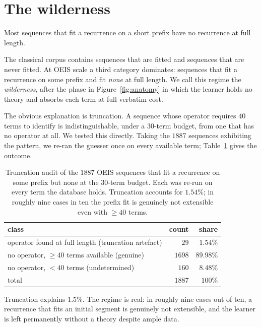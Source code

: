 \documentclass[10pt]{article}
\theoremstyle{definition}
\theoremstyle{plain}
\begin{document}
\section{The wilderness}
\label{sec:wilderness}

Most sequences that fit a recurrence on a short prefix have no recurrence at
full length.

The classical corpus contains sequences that are fitted and sequences that are
never fitted. At OEIS scale a third category dominates: sequences that fit a
recurrence on some prefix and fit \emph{none} at full length. We call this
regime the \emph{wilderness}, after the phase in Figure~\ref{fig:anatomy} in
which the learner holds no theory and absorbs each term at full verbatim cost.

The obvious explanation is truncation. A sequence whose operator requires $40$
terms to identify is indistinguishable, under a $30$-term budget, from one that
has no operator at all. We tested this directly. Taking the $1887$ sequences
exhibiting the pattern, we re-ran the guesser once on every available term;
Table~\ref{tab:wilderness} gives the outcome.

\begin{table}[h]
\centering
\small
\begin{tabular}{lrr}
\toprule
class & count & share \\
\midrule
operator found at full length (truncation artefact) & $29$ & $1.54\%$ \\
no operator, $\ge 40$ terms available (genuine)     & $1698$ & $89.98\%$ \\
no operator, $< 40$ terms (undetermined)            & $160$ & $8.48\%$ \\
\midrule
total & $1887$ & $100\%$ \\
\bottomrule
\end{tabular}
\caption{Truncation audit of the $1887$ OEIS sequences that fit a recurrence on
some prefix but none at the $30$-term budget. Each was re-run on every term the
database holds. Truncation accounts for $1.54\%$; in roughly nine cases in ten
the prefix fit is genuinely not extensible even with $\ge 40$ terms.}
\label{tab:wilderness}
\end{table}

Truncation explains $1.5\%$. The regime is real: in roughly nine cases out of
ten, a recurrence that fits an initial segment is genuinely not extensible, and
the learner is left permanently without a theory despite ample data.
\end{document}
